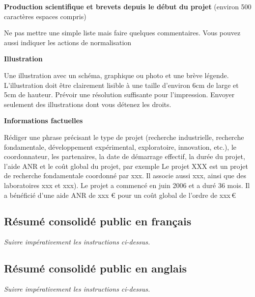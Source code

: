\documentclass[a4paper,11pt]{article}
\newcommand{\instructions}[1]{%
		{%
			\setlength{\parindent}{0cm}%
			{\em\color{ANRvert}#1}%
		}%
	}
\newcommand{\instructions}[1]{}
\begin{document}
{\bigskip

\textbf{Production scientifique et brevets depuis le début du projet} (environ 500 caractères espaces compris) 

Ne pas mettre une simple liste mais faire quelques commentaires. Vous pouvez aussi indiquer les actions de normalisation

\bigskip

\textbf{Illustration}

Une illustration avec un schéma, graphique ou photo et une brève légende. L'illustration doit être clairement lisible à une taille d'environ 6cm de large et 5cm de hauteur. Prévoir une résolution suffisante pour l'impression. Envoyer seulement des illustrations dont vous détenez les droits.

\bigskip

\textbf{Informations factuelles}

Rédiger une phrase précisant le type de projet (recherche industrielle, recherche fondamentale, développement expérimental, exploratoire, innovation, etc.), le coordonnateur, les partenaires, la date de démarrage effectif, la durée du projet, l'aide ANR et le coût global du projet, par exemple \og{}Le projet XXX est un projet de recherche fondamentale coordonné par xxx. Il associe aussi xxx, ainsi que des laboratoires xxx et xxx). Le projet a commencé en juin 2006 et a duré 36 mois. Il a bénéficié d'une aide ANR de xxx € pour un coût global de l'ordre de xxx\,€\fg{}
}








\subsection{Résumé consolidé public en français}

\instructions{Suivre impérativement les instructions ci-dessus.}

\subsection{Résumé consolidé public en anglais}

\instructions{Suivre impérativement les instructions ci-dessus.}
\end{document}
